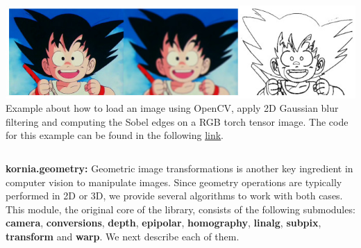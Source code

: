 \begin{tcolorbox}[every float=\centering, drop shadow, title=Example 4: Image filtering and Edge detection]
    \label{fig:examples:filters}
    \includegraphics[width=1.\linewidth]{main/chapter03/data/examples/goku_filters.jpg}
    {Example about how to load an image using OpenCV, apply  2D Gaussian blur filtering and computing the Sobel edges on a RGB torch tensor image. The code for this example can be found in the following \underline{\color{blue}\href{https://colab.research.google.com/drive/1IiNHo5TjgQShrI7XoMOtam3PyZ9FNToh}{link}}.}
    \inputminted[python3, baselinestretch=1., style=vs, fontfamily=courier, fontsize=\footnotesize, funcnamehighlighting=true]{python}{main/chapter03/data/examples/snipet_filters.py}
\end{tcolorbox}

\newpage

\noindent\textbf{kornia.geometry:} Geometric image transformations is another key ingredient in computer vision to manipulate images. Since geometry operations are typically performed in 2D or 3D,  we provide several algorithms to work with both cases. This module, the original core of the library, consists of the following submodules: \textbf{camera}, \textbf{conversions}, \textbf{depth}, \textbf{epipolar}, \textbf{homography}, \textbf{linalg}, \textbf{subpix}, \textbf{transform} and \textbf{warp}. We next describe each of them.

